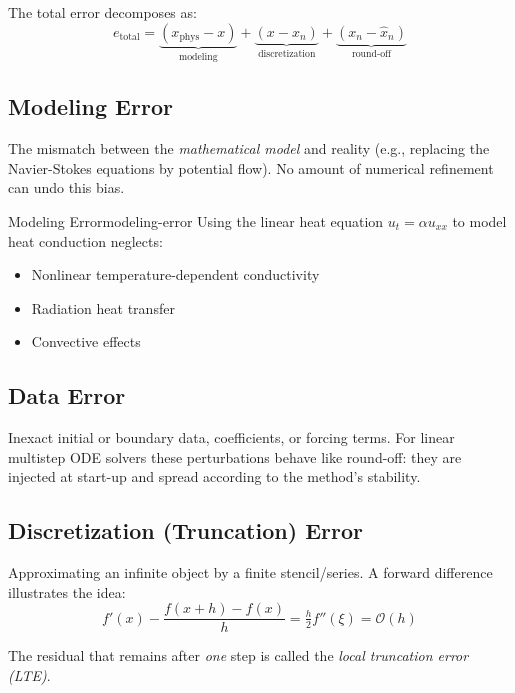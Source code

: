 The total error decomposes as:
\[
    \boxed{e_{\text{total}} = \underbrace{(x_{\text{phys}} - x)}_{\text{modeling}} + \underbrace{(x - x_n)}_{\text{discretization}} + \underbrace{(x_n - \hat{x}_n)}_{\text{round-off}}}
\]

\subsection{Modeling Error}
\label{subsec:modeling-error}

The mismatch between the \emph{mathematical model} and reality (e.g., replacing the Navier-Stokes equations by potential flow). No amount of numerical refinement can undo this bias.

\begin{example}{Modeling Error}{modeling-error}
    Using the linear heat equation $u_t = \alpha u_{xx}$ to model heat conduction neglects:
    \begin{itemize}
        \item Nonlinear temperature-dependent conductivity
        \item Radiation heat transfer
        \item Convective effects
    \end{itemize}
\end{example}

\subsection{Data Error}
\label{subsec:data-error}

Inexact initial or boundary data, coefficients, or forcing terms. For linear multistep ODE solvers these perturbations behave like round-off: they are injected at start-up and spread according to the method's stability.

\subsection{Discretization (Truncation) Error}
\label{subsec:discretization-error}

Approximating an infinite object by a finite stencil/series. A forward difference illustrates the idea:
\[
    f'(x) - \frac{f(x+h)-f(x)}{h} = \tfrac{h}{2}f''(\xi) = \mathcal{O}(h)
\]

The residual that remains after \emph{one} step is called the \emph{local truncation error (LTE)}.

